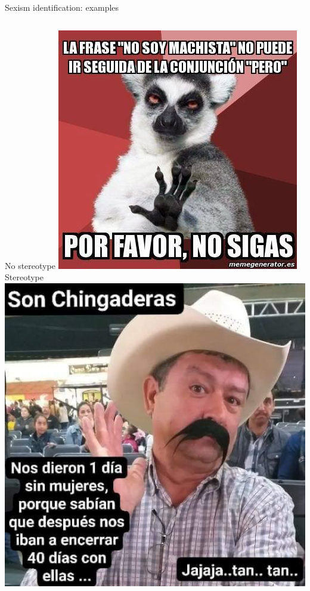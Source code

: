 \begin{frame}{Sexism identification: examples}
    \begin{columns}
        \centering
        No stereotype
        \includegraphics[width=\textwidth]{images/110056.jpeg}
        \centering
        Stereotype
        \includegraphics[width=\textwidth]{images/110061.jpeg}
    \end{columns}
\end{frame}

